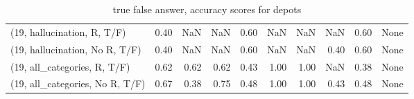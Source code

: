 \begin{table*}[h!]
\begin{adjustbox}{width=2\columnwidth,center}
\begin{tabular}{lrrr|rrr|rrr}
(19, hallucination, R, T/F)           &                      0.40 &                   NaN &                       NaN &                          0.60 &                       NaN &                           NaN &                                    NaN &                               0.60 &                                  None \\
(19, hallucination, No R, T/F)        &                      0.40 &                   NaN &                       NaN &                          0.60 &                       NaN &                           NaN &                                   0.40 &                               0.60 &                                  None \\
(19, all\_categories, R, T/F)          &                      0.62 &                  0.62 &                      0.62 &                          0.43 &                      1.00 &                          1.00 &                                    NaN &                               0.38 &                                  None \\
(19, all\_categories, No R, T/F)       &                      0.67 &                  0.38 &                      0.75 &                          0.48 &                      1.00 &                          1.00 &                                   0.43 &                               0.48 &                                  None \\


\bottomrule
\end{tabular}
\end{adjustbox}
\caption{true false answer, accuracy scores for depots}
\end{table*}